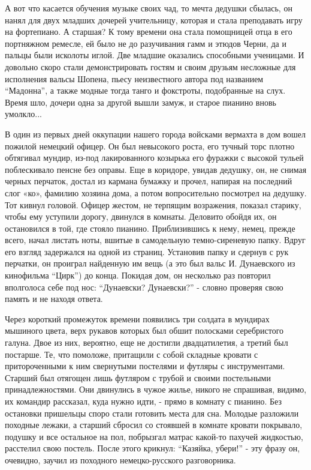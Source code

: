 А вот что касается обучения музыке своих чад, то мечта дедушки сбылась, он
нанял для двух младших дочерей учительницу, которая и стала преподавать игру на
фортепиано. А старшая? К тому времени она стала помощницей отца в его
портняжном ремесле, ей было не до разучивания гамм и этюдов Черни, да и пальцы
были исколоты иглой. Две младшие оказались способными ученицами. И довольно
скоро стали демонстрировать гостям и своим друзьям несложные для исполнения
вальсы Шопена, пьесу неизвестного автора под названием \enquote{Мадонна}, а также
модные тогда танго и фокстроты, подобранные на слух. Время шло, дочери одна за
другой вышли замуж, и старое пианино вновь умолкло...

В один из первых дней оккупации нашего города войсками вермахта в дом вошел
пожилой немецкий офицер. Он был невысокого роста, его тучный торс плотно
обтягивал мундир, из-под лакированного козырька его фуражки с высокой тульей
поблескивало пенсне без оправы. Еще в коридоре, увидав дедушку, он, не снимая
черных перчаток, достал из кармана бумажку и прочел, напирая на последний слог
«ко», фамилию хозяина дома, а потом вопросительно посмотрел на дедушку. Тот
кивнул головой. Офицер жестом, не терпящим возражения, показал старику, чтобы
ему уступили дорогу, двинулся в комнаты. Деловито обойдя их, он остановился в
той, где стояло пианино. Приблизившись к нему, немец, прежде всего, начал
листать ноты, вшитые в самодельную темно-сиреневую папку. Вдруг его взгляд
задержался на одной из страниц. Установив папку и сдернув с рук перчатки, он
проиграл найденную им вещь (а это был вальс И. Дунаевского из кинофильма \enquote{Цирк})
до конца. Покидая дом, он несколько раз повторил вполголоса себе под нос:
\enquote{Дунаевски? Дунаевски?} - словно проверяя свою память и не находя ответа.

Через короткий промежуток времени  появились три солдата в мундирах мышиного
цвета, верх рукавов которых был обшит полосками серебристого галуна. Двое из
них, вероятно, еще не достигли двадцатилетия, а третий был постарше. Те, что
помоложе, притащили с собой складные кровати с притороченными к ним свернутыми
постелями и футляры с инструментами. Старший был отягощен лишь футляром с
трубой и своими постельными принадлежностями. Они двинулись в чужое жилье,
никого не спрашивая, видимо, их командир рассказал, куда нужно идти, - прямо в
комнату с пианино. Без остановки пришельцы споро стали готовить места для сна.
Молодые разложили походные лежаки, а старший сбросил со стоявшей в комнате
кровати покрывало, подушку и все остальное на пол, побрызгал матрас какой-то
пахучей жидкостью, расстелил свою постель. После этого крикнул: \enquote{Казяйка,
убери!} - эту фразу он, очевидно, заучил из походного немецко-русского
разговорника.

